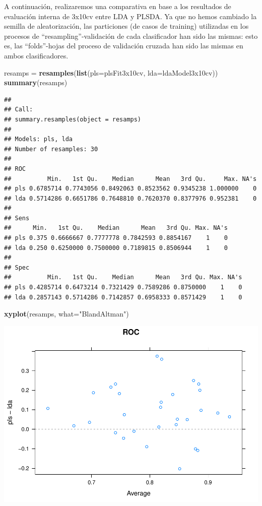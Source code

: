\documentclass[
]{article}
\newenvironment{Shaded}{\begin{snugshade}}{\end{snugshade}}
\newcommand{\DataTypeTok}[1]{\textcolor[rgb]{0.13,0.29,0.53}{#1}}
\newcommand{\KeywordTok}[1]{\textcolor[rgb]{0.13,0.29,0.53}{\textbf{#1}}}
\newcommand{\NormalTok}[1]{#1}
\newcommand{\StringTok}[1]{\textcolor[rgb]{0.31,0.60,0.02}{#1}}
\begin{document}
A continuación, realizaremos una comparativa en base a los resultados de
evaluación interna de 3x10cv entre LDA y PLSDA. Ya que no hemos cambiado
la semilla de aleatorización, las particiones (de casos de training)
utilizadas en los procesos de ``resampling''-validación de cada
clasificador han sido las mismas: esto es, las ``folds''-hojas del
proceso de validación cruzada han sido las mismas en ambos
clasificadores.

\begin{Shaded}
\begin{Highlighting}[]
\NormalTok{resamps =}\StringTok{ }\KeywordTok{resamples}\NormalTok{(}\KeywordTok{list}\NormalTok{(}\DataTypeTok{pls=}\NormalTok{plsFit3x10cv, }\DataTypeTok{lda=}\NormalTok{ldaModel3x10cv))}
\KeywordTok{summary}\NormalTok{(resamps)}
\end{Highlighting}
\end{Shaded}

\begin{verbatim}
## 
## Call:
## summary.resamples(object = resamps)
## 
## Models: pls, lda 
## Number of resamples: 30 
## 
## ROC 
##          Min.   1st Qu.    Median      Mean   3rd Qu.     Max. NA's
## pls 0.6785714 0.7743056 0.8492063 0.8523562 0.9345238 1.000000    0
## lda 0.5714286 0.6651786 0.7648810 0.7620370 0.8377976 0.952381    0
## 
## Sens 
##      Min.   1st Qu.    Median      Mean   3rd Qu. Max. NA's
## pls 0.375 0.6666667 0.7777778 0.7842593 0.8854167    1    0
## lda 0.250 0.6250000 0.7500000 0.7189815 0.8506944    1    0
## 
## Spec 
##          Min.   1st Qu.    Median      Mean   3rd Qu. Max. NA's
## pls 0.4285714 0.6473214 0.7321429 0.7589286 0.8750000    1    0
## lda 0.2857143 0.5714286 0.7142857 0.6958333 0.8571429    1    0
\end{verbatim}

\begin{Shaded}
\begin{Highlighting}[]
\KeywordTok{xyplot}\NormalTok{(resamps, }\DataTypeTok{what=}\StringTok{"BlandAltman"}\NormalTok{)}
\end{Highlighting}
\end{Shaded}

\begin{center}\includegraphics[width=0.7\linewidth]{tutorial_files/figure-latex/unnamed-chunk-14-1} \end{center}
\end{document}
